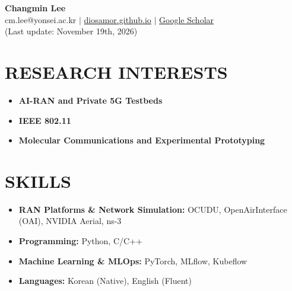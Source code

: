 \documentclass[a4paper,9pt]{extarticle}
\begin{document}
\pagestyle{empty}

\begin{center}
\textbf{\Large Changmin Lee}\\[8pt] %
cm.lee@yonsei.ac.kr $|$ \href{https://diosamor.github.io}{diosamor.github.io} $|$ \href{https://scholar.google.com/citations?user=7nGSgqoAAAAJ&hl=en}{Google Scholar} \\
(Last update: November 19th, 2026)
\end{center}


\section*{RESEARCH INTERESTS}
\noindent
\begin{itemize}[leftmargin=1.5em, itemsep=0.3em]
    \item \textbf{AI-RAN and Private 5G Testbeds}
    \item \textbf{IEEE 802.11}
    \item \textbf{Molecular Communications and Experimental Prototyping}
\end{itemize}

\section*{SKILLS}
\begin{itemize}
    \item \textbf{RAN Platforms \& Network Simulation:} OCUDU, OpenAirInterface (OAI), NVIDIA Aerial, ns-3
    \item \textbf{Programming:} Python, C/C++
    \item \textbf{Machine Learning \& MLOps:} PyTorch, MLflow, Kubeflow
    \item \textbf{Languages:} Korean (Native), English (Fluent)
\end{itemize}

\end{document}
